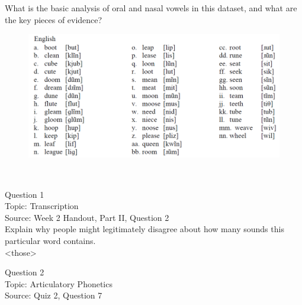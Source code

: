 \documentclass[12pt]{article}
\begin{document}
What is the basic analysis of oral and nasal vowels in this dataset, and what are the key pieces of evidence?\\

\begin{figure}[H]
\includegraphics{../images/english12.png}
\end{figure}

\newpage

\begin{center}
\textbf{{\color{red}{\HUGE END OF EXAM}}}\\

\end{center}
\newpage

\begin{center}
\textbf{{\color{blue}{\HUGE START OF EXAM\\}}}

\textbf{{\color{blue}{\HUGE Student ID: 30794\\}}}

\textbf{{\color{blue}{\HUGE \\}}}

\end{center}
\newpage

{\large Question 1}\\

Topic: Transcription\\
Source: Week 2 Handout, Part II, Question 2\\

Explain why people might legitimately disagree about how many sounds this particular word contains.\\

<those>


\newpage

{\large Question 2}\\

Topic: Articulatory Phonetics\\
Source: Quiz 2, Question 7\\
\end{document}

